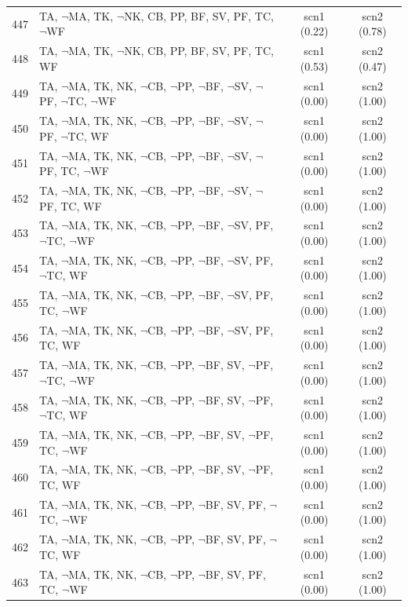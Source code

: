 \documentclass[12pt]{article}
\begin{document}
\begin{longtable}{|l|l|c|c|}
447 & TA, $\neg$MA, TK, $\neg$NK, CB, PP, BF, SV, PF, TC, $\neg$WF & scn1 (0.22) & scn2 (0.78)\\
448 & TA, $\neg$MA, TK, $\neg$NK, CB, PP, BF, SV, PF, TC, WF & scn1 (0.53) & scn2 (0.47)\\
449 & TA, $\neg$MA, TK, NK, $\neg$CB, $\neg$PP, $\neg$BF, $\neg$SV, $\neg$PF, $\neg$TC, $\neg$WF & scn1 (0.00) & scn2 (1.00)\\
450 & TA, $\neg$MA, TK, NK, $\neg$CB, $\neg$PP, $\neg$BF, $\neg$SV, $\neg$PF, $\neg$TC, WF & scn1 (0.00) & scn2 (1.00)\\
451 & TA, $\neg$MA, TK, NK, $\neg$CB, $\neg$PP, $\neg$BF, $\neg$SV, $\neg$PF, TC, $\neg$WF & scn1 (0.00) & scn2 (1.00)\\
452 & TA, $\neg$MA, TK, NK, $\neg$CB, $\neg$PP, $\neg$BF, $\neg$SV, $\neg$PF, TC, WF & scn1 (0.00) & scn2 (1.00)\\
453 & TA, $\neg$MA, TK, NK, $\neg$CB, $\neg$PP, $\neg$BF, $\neg$SV, PF, $\neg$TC, $\neg$WF & scn1 (0.00) & scn2 (1.00)\\
454 & TA, $\neg$MA, TK, NK, $\neg$CB, $\neg$PP, $\neg$BF, $\neg$SV, PF, $\neg$TC, WF & scn1 (0.00) & scn2 (1.00)\\
455 & TA, $\neg$MA, TK, NK, $\neg$CB, $\neg$PP, $\neg$BF, $\neg$SV, PF, TC, $\neg$WF & scn1 (0.00) & scn2 (1.00)\\
456 & TA, $\neg$MA, TK, NK, $\neg$CB, $\neg$PP, $\neg$BF, $\neg$SV, PF, TC, WF & scn1 (0.00) & scn2 (1.00)\\
457 & TA, $\neg$MA, TK, NK, $\neg$CB, $\neg$PP, $\neg$BF, SV, $\neg$PF, $\neg$TC, $\neg$WF & scn1 (0.00) & scn2 (1.00)\\
458 & TA, $\neg$MA, TK, NK, $\neg$CB, $\neg$PP, $\neg$BF, SV, $\neg$PF, $\neg$TC, WF & scn1 (0.00) & scn2 (1.00)\\
459 & TA, $\neg$MA, TK, NK, $\neg$CB, $\neg$PP, $\neg$BF, SV, $\neg$PF, TC, $\neg$WF & scn1 (0.00) & scn2 (1.00)\\
460 & TA, $\neg$MA, TK, NK, $\neg$CB, $\neg$PP, $\neg$BF, SV, $\neg$PF, TC, WF & scn1 (0.00) & scn2 (1.00)\\
461 & TA, $\neg$MA, TK, NK, $\neg$CB, $\neg$PP, $\neg$BF, SV, PF, $\neg$TC, $\neg$WF & scn1 (0.00) & scn2 (1.00)\\
462 & TA, $\neg$MA, TK, NK, $\neg$CB, $\neg$PP, $\neg$BF, SV, PF, $\neg$TC, WF & scn1 (0.00) & scn2 (1.00)\\
463 & TA, $\neg$MA, TK, NK, $\neg$CB, $\neg$PP, $\neg$BF, SV, PF, TC, $\neg$WF & scn1 (0.00) & scn2 (1.00)\\

\end{longtable}
\end{document}
